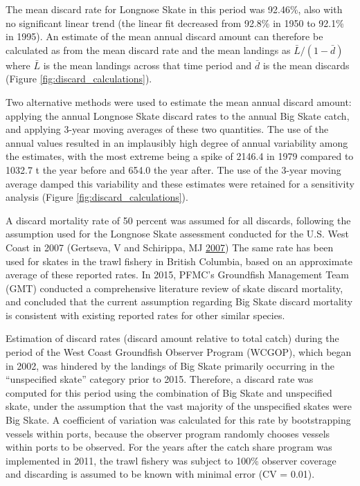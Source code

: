 \documentclass[12pt,]{article}
\begin{document}
The mean discard rate for Longnose Skate in this period was 92.46\%,
also with no significant linear trend (the linear fit decreased from
92.8\% in 1950 to 92.1\% in 1995). An estimate of the mean annual
discard amount can therefore be calculated as from the mean discard rate
and the mean landings as \(\bar{L} / (1 - \bar{d})\) where \(\bar{L}\)
is the mean landings across that time period and \(\bar{d}\) is the mean
discards (Figure \ref{fig:discard_calculations}).

Two alternative methods were used to estimate the mean annual discard
amount: applying the annual Longnose Skate discard rates to the annual
Big Skate catch, and applying 3-year moving averages of these two
quantities. The use of the annual values resulted in an implausibly high
degree of annual variability among the estimates, with the most extreme
being a spike of 2146.4 in 1979 compared to 1032.7 t the year before and
654.0 the year after. The use of the 3-year moving average damped this
variability and these estimates were retained for a sensitivity analysis
(Figure \ref{fig:discard_calculations}).

A discard mortality rate of 50 percent was assumed for all discards,
following the assumption used for the Longnose Skate assessment
conducted for the U.S. West Coast in 2007 (Gertseva, V and Schirippa, MJ
\protect\hyperlink{ref-Gertseva2007}{2007}) The same rate has been used
for skates in the trawl fishery in British Columbia, based on an
approximate average of these reported rates. In 2015, PFMC's Groundfish
Management Team (GMT) conducted a comprehensive literature review of
skate discard mortality, and concluded that the current assumption
regarding Big Skate discard mortality is consistent with existing
reported rates for other similar species.

Estimation of discard rates (discard amount relative to total catch)
during the period of the West Coast Groundfish Observer Program (WCGOP),
which began in 2002, was hindered by the landings of Big Skate primarily
occurring in the ``unspecified skate'' category prior to 2015.
Therefore, a discard rate was computed for this period using the
combination of Big Skate and unspecified skate, under the assumption
that the vast majority of the unspecified skates were Big Skate. A
coefficient of variation was calculated for this rate by bootstrapping
vessels within ports, because the observer program randomly chooses
vessels within ports to be observed. For the years after the catch share
program was implemented in 2011, the trawl fishery was subject to 100\%
observer coverage and discarding is assumed to be known with minimal
error (CV = 0.01).
\end{document}
